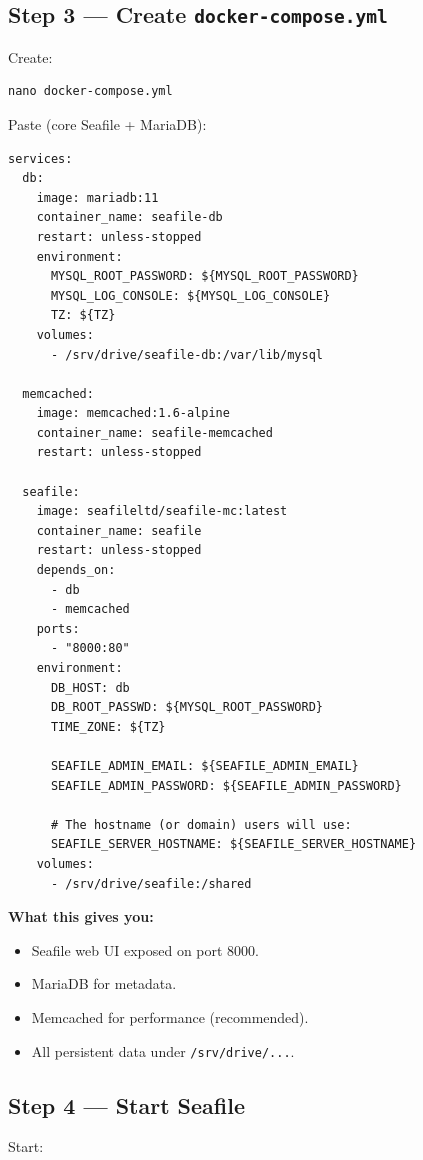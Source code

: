 \subsection{Step 3 --- Create \texttt{docker-compose.yml}}
Create:

\begin{lstlisting}
nano docker-compose.yml
\end{lstlisting}

Paste (core Seafile + MariaDB):

\begin{lstlisting}
services:
  db:
    image: mariadb:11
    container_name: seafile-db
    restart: unless-stopped
    environment:
      MYSQL_ROOT_PASSWORD: ${MYSQL_ROOT_PASSWORD}
      MYSQL_LOG_CONSOLE: ${MYSQL_LOG_CONSOLE}
      TZ: ${TZ}
    volumes:
      - /srv/drive/seafile-db:/var/lib/mysql

  memcached:
    image: memcached:1.6-alpine
    container_name: seafile-memcached
    restart: unless-stopped

  seafile:
    image: seafileltd/seafile-mc:latest
    container_name: seafile
    restart: unless-stopped
    depends_on:
      - db
      - memcached
    ports:
      - "8000:80"
    environment:
      DB_HOST: db
      DB_ROOT_PASSWD: ${MYSQL_ROOT_PASSWORD}
      TIME_ZONE: ${TZ}

      SEAFILE_ADMIN_EMAIL: ${SEAFILE_ADMIN_EMAIL}
      SEAFILE_ADMIN_PASSWORD: ${SEAFILE_ADMIN_PASSWORD}

      # The hostname (or domain) users will use:
      SEAFILE_SERVER_HOSTNAME: ${SEAFILE_SERVER_HOSTNAME}
    volumes:
      - /srv/drive/seafile:/shared
\end{lstlisting}

\textbf{What this gives you:}
\begin{itemize}[leftmargin=*]
  \item Seafile web UI exposed on port 8000.
  \item MariaDB for metadata.
  \item Memcached for performance (recommended).
  \item All persistent data under \texttt{/srv/drive/...}.
\end{itemize}


\subsection{Step 4 --- Start Seafile}
Start:

